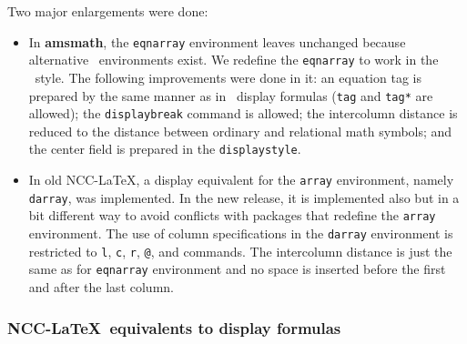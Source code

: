 \documentclass[11pt]{ncc}
\newcommand*\package[1]{\textbf{#1}}
\newcommand*\Meta[1]{\texttt{\upshape#1}}
\newcommand*\com[1]{\Meta{\symbol{"5C}#1}}
\begin{document}
Two major enlargements were done:
\begin{itemize}
\item In \package{amsmath}, the \Meta{eqnarray} environment leaves
unchanged because alternative \AmS\ environments exist. We
redefine the \Meta{eqnarray} to work in the \AmS\ style. The
following improvements were done in it: an equation tag is
prepared by the same manner as in \AmS\ display formulas
(\com{tag} and \com{tag*} are allowed); the \com{displaybreak}
command is allowed; the intercolumn distance is reduced to the
distance between ordinary and relational math symbols; and the
center field is prepared in the \com{displaystyle}.

\item In old NCC-\LaTeX, a display equivalent for the \Meta{array}
environment, namely \Meta{darray}, was implemented. In the new
release, it is implemented also but in a bit different way to
avoid conflicts with packages that redefine the \Meta{array}
environment. The use of column specifications in the
\Meta{darray} environment is restricted to \Meta{l}, \Meta{c},
\Meta{r}, \Meta{@}, and \Meta{*} commands. The intercolumn
distance is just the same as for \Meta{eqnarray} environment and
no space is inserted before the first and after the last column.

\end{itemize}

\subsubsection{NCC-\LaTeX\ equivalents to display formulas}
\end{document}
